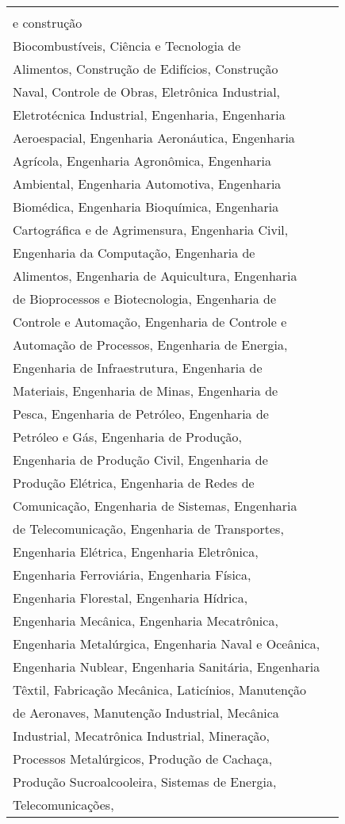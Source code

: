 \begin{longtable}[c]{ll}
    \begin{tabular}[c]{@{}l@{}}Engenharia, manufatura\\ e construção\end{tabular}   & \begin{tabular}[c]{@{}l@{}}Arquitetura e Urbanismo, Automação Industrial, \\ Biocombustíveis, Ciência e Tecnologia de \\ Alimentos, Construção de Edifícios, Construção \\ Naval, Controle de Obras, Eletrônica Industrial, \\ Eletrotécnica Industrial, Engenharia, Engenharia \\ Aeroespacial, Engenharia Aeronáutica, Engenharia \\ Agrícola, Engenharia Agronômica, Engenharia \\ Ambiental, Engenharia Automotiva, Engenharia \\ Biomédica, Engenharia Bioquímica, Engenharia \\ Cartográfica e de Agrimensura, Engenharia Civil, \\ Engenharia da Computação, Engenharia de \\ Alimentos, Engenharia de Aquicultura, Engenharia\\ de Bioprocessos e Biotecnologia, Engenharia de \\ Controle e Automação, Engenharia de Controle e\\ Automação de Processos, Engenharia de Energia,\\ Engenharia de Infraestrutura, Engenharia de \\ Materiais, Engenharia de Minas, Engenharia de \\ Pesca, Engenharia de Petróleo, Engenharia de \\ Petróleo e Gás, Engenharia de Produção, \\ Engenharia de Produção Civil, Engenharia de\\ Produção Elétrica, Engenharia de Redes de\\ Comunicação, Engenharia de Sistemas, Engenharia\\ de Telecomunicação, Engenharia de Transportes,\\ Engenharia Elétrica, Engenharia Eletrônica,\\ Engenharia Ferroviária, Engenharia Física,\\ Engenharia Florestal, Engenharia Hídrica,\\ Engenharia Mecânica, Engenharia Mecatrônica,\\ Engenharia Metalúrgica, Engenharia Naval e Oceânica,\\ Engenharia Nublear, Engenharia Sanitária, Engenharia\\ Têxtil, Fabricação Mecânica, Laticínios, Manutenção\\ de Aeronaves, Manutenção Industrial, Mecânica\\ Industrial, Mecatrônica Industrial, Mineração,\\ Processos Metalúrgicos, Produção de Cachaça,\\ Produção Sucroalcooleira, Sistemas de Energia,\\ Telecomunicações, 
\end{longtable}
